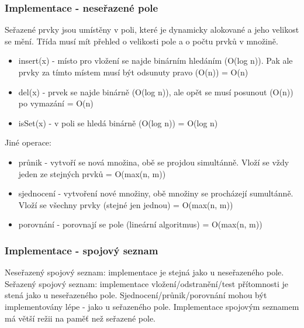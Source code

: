 \documentclass{szzclass}
\begin{document}
\subsubsection{Implementace - neseřazené pole}
Seřazené prvky jsou umístěny v poli, které je dynamicky alokované a jeho velikost se mění. Třída musí mít přehled o velikosti pole
a o počtu prvků v množině.
\begin{itemize}
    \item insert(x) - místo pro vložení se najde binárním hledáním (O(log n)). Pak ale prvky za tímto místem musí být odsunuty pravo (O(n)) = O(n)
    \item del(x) - prvek se najde binárně (O(log n)), ale opět se musí posunout (O(n)) po vymazání = O(n)
    \item isSet(x) - v poli se hledá binárně (O(log n)) = O(log n)
\end{itemize}
Jiné operace:
\begin{itemize}
    \item průnik - vytvoří se nová množina, obě se projdou simultánně. Vloží se vždy jeden ze stejných prvků = O(max(n, m))
    \item sjednocení - vytvoření nové množiny, obě množiny se procházejí sumultánně. Vloží se všechny prvky (stejné jen jednou) = O(max(n, m))
    \item porovnání - porovnají se pole (lineární algoritmus) = O(max(n, m))
\end{itemize}
\subsubsection{Implementace - spojový seznam}
Neseřazený spojový seznam: implementace je stejná jako u neseřazeného pole.\newline
Seřazený spojový seznam: implementace vložení/odstranění/test přítomnosti je stená jako u neseřazeného pole. Sjednocení/průnik/porovnání mohou být
implementovány lépe - jako u seřazeného pole.\newline
Implementace spojovým seznamem má větší režii na paměť než seřazené pole.
\end{document}
